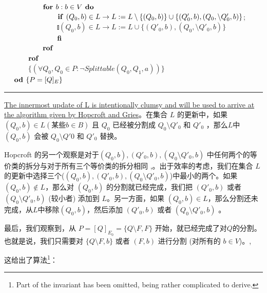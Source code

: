 \mbox{　　　　　} $ \mbox{\textbf{for }} b:b \in V \mbox{\textbf{ do }} $ \\
\mbox{　　　　　　　} $ \mbox{\textbf{if }} (Q_0,b) \in L \rightarrow L := L \setminus \{ (Q_0,b) \} \cup \{ (Q'_0,b),(Q_0, \setminus Q'_0,b ) \} $;\\ 
\mbox{　　　　　　　} $ \talloblong (Q_0,b) \in L \rightarrow L := L \cup \{ (Q'_0,b),(Q_0, \setminus Q'_0,b ) \} $ \\
\mbox{　　　　　　　} $ \mbox{\textbf{fi}} $ \\
\mbox{　　　　　} $ \mbox{\textbf{rof}} $ \\
\mbox{　　　} $ \mbox{\textbf{rof}} $ \\
\mbox{　　　} $ \{ (\forall Q_0,Q_0 \in P : \neg Splittable(Q_0,Q_1,a)) \} $ \\
\mbox{　} $ \mbox{\textbf{od }} \{ P = [Q]_E \} $ \\
\rule{\textwidth}{1pt}

\uline{The innermost update of L is intentionally clumsy and will be used to arrive at the algorithm given by Hopcroft and Gries}。在集合 $L$ 的更新中，如果 $ (Q_0,b) \in L (\mbox{某些}b \in B) $ 且 $Q_0$ 已经被分割成 $ Q_0 \setminus Q'_0 $ 和 $ Q'_0 $ ，那么$L$中 $(Q_0,b)$ 会被 $ Q_0 \setminus Q'0 $ 和 $ Q'_0 $ 替换。

Hopcroft 的另一个观察是对于$ (Q_0,b),(Q'_0,b) ,(Q_0 \setminus Q'_0,b) $ 中任何两个的等价类的拆分与对于所有三个等价类的拆分相同 \cite[pp. 190-191]{Hopc71},\cite[引理 6]{Grie73}。出于效率的考虑，我们在集合 $L$ 的更新中选择三个($ (Q_0,b),(Q'_0,b) ,(Q_0 \setminus Q'_0,b) $)中最小的两个。如果 $(Q_0,b) \not\in L$，那么对 $(Q_0,b)$ 的分割就已经完成，我们把 $ (Q'_0,b) $ 或者  $ (Q_0 \setminus Q'_0,b) $ (较小者) 添加到 $L$。另一方面，如果  $(Q_0,b) \in L$，那么分割还未完成，从$L$中移除$(Q_0,b)$，然后添加 $ (Q'_0,b) $ 或者  $ (Q_0 \setminus Q'_0,b) $ 。

最后，我们观察到，从 $ P= [Q]_{E_0} = \{ Q \setminus F,F \} $ 开始，就已经完成了对$Q$的分割。也就是说，我们只需要对 $ \{ Q \setminus F,b \} $ 或者 $ (F,b) $ 进行分割 (对所有的 $b\in V$)。\cite[pp. 190-191]{Hopc71},\cite[引理 6]{Grie73}

这给出了算法\footnote{Part of the invariant has been omitted, being rather complicated to derive.}：

